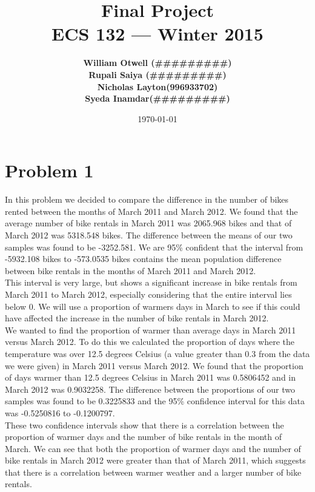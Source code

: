 \documentclass[11pt]{article}
\title{\vspace{-3ex}\bf Final Project\\[2ex] 
       \normalsize ECS 132 --- Winter 2015}
\date{\today}
\author{\bf William Otwell (\#\#\#\#\#\#\#\#\#)\\ \bf Rupali Saiya (\#\#\#\#\#\#\#\#\#)\\ \bf Nicholas Layton(996933702)\\ \bf Syeda Inamdar(\#\#\#\#\#\#\#\#\#)\\}
\begin{document}
\maketitle
\pagebreak
\tableofcontents
\pagebreak

\section{Problem 1}

In this problem we decided to compare the difference in the number of bikes rented between the months of March 2011 and March 2012. We found that the average number of bike rentals in March 2011 was 2065.968 bikes and that of March 2012 was 5318.548 bikes. The difference between the means of our two samples was found to be -3252.581. We are 95\% confident that the interval from -5932.108 bikes to -573.0535 bikes contains the mean population difference between bike rentals in the months of March 2011 and March 2012.  
\\

This interval is very large, but shows a significant increase in bike rentals from March 2011 to March 2012, especially considering that the entire interval lies below 0. We will use a proportion of warmers days in March to see if this could have affected the increase in the number of bike rentals in March 2012.
\\

We wanted to find the proportion of warmer than average days in March 2011 versus March 2012. To do this we calculated the proportion of days where the temperature was over 12.5 degrees Celsius (a value greater than 0.3 from the data we were given) in March 2011 versus March 2012. We found that the proportion of days warmer than 12.5 degrees Celsius in March 2011 was 0.5806452 and in March 2012 was 0.9032258. The difference between the proportions of our two samples was found to be 0.3225833 and the 95\% confidence interval for this data was -0.5250816 to -0.1200797. 
\\

These two confidence intervals show that there is a correlation between the proportion of warmer days and the number of bike rentals in the month of March. We can see that both the proportion of warmer days and the number of bike rentals in March 2012 were greater than that of March 2011, which suggests that there is a correlation between warmer weather and a larger number of bike rentals.
\end{document}
